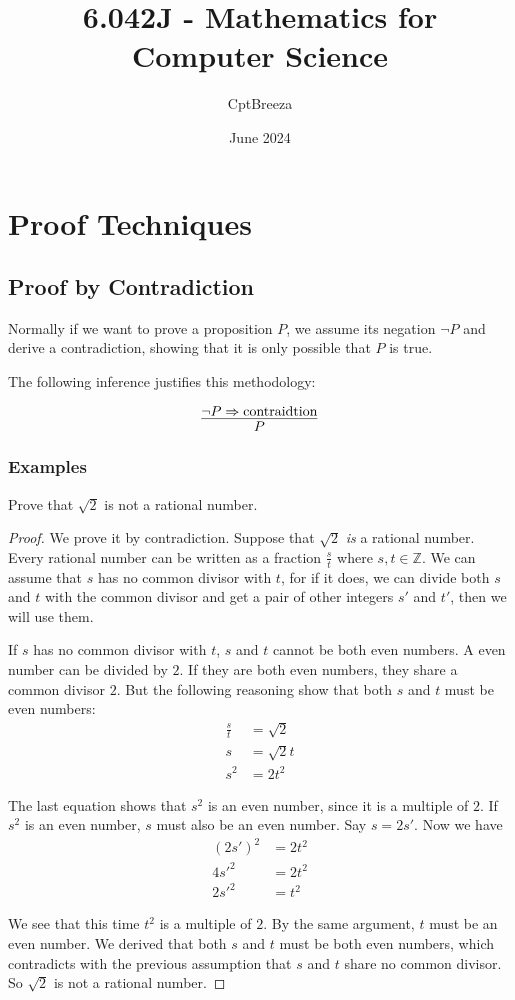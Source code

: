 \documentclass[11pt]{article}
\title{6.042J - Mathematics for Computer Science}
\author{CptBreeza}
\date{June 2024}
\begin{document}
\maketitle

\section{Proof Techniques}

\subsection{Proof by Contradiction}

Normally if we want to prove a proposition $P$, we assume its negation $\neg P$ and derive
a contradiction, showing that it is only possible that $P$ is true.

The following inference justifies this methodology:

\[
\infer{P}{\neg P \Rightarrow \text{contraidtion}}
\]

\subsubsection{Examples}

Prove that $\sqrt{2}$ is not a rational number.

\begin{proof}
We prove it by contradiction. Suppose that $\sqrt{2}$ \emph{is} a rational number. Every rational number can be written as a fraction $\frac{s}{t}$ where $s,t \in \mathbb{Z}$. We can assume that $s$ has no common divisor with $t$, for if it does, we can divide both $s$
and $t$ with the common divisor and get a pair of other integers $s'$ and $t'$, then we
will use them.

If $s$ has no common divisor with $t$, $s$ and $t$ cannot be both even numbers. A even
number can be divided by $2$. If they are both even numbers, they share a common divisor
$2$. But the following reasoning show that both $s$ and $t$ must be even numbers:
\begin{align*}
\frac{s}{t} &= \sqrt{2} \\
s &= \sqrt{2}t \\
s^2 &= 2t^2
\end{align*}

The last equation shows that $s^2$ is an even number, since it is a multiple of $2$. If
$s^2$ is an even number, $s$ must also be an even number. Say $s = 2s'$. Now we have
\begin{align*}
(2s')^2 &= 2t^2 \\
4s'^2 &= 2t^2 \\
2s'^2 &= t^2
\end{align*}

We see that this time $t^2$ is a multiple of $2$. By the same argument, $t$ must be an even
number. We derived that both $s$ and $t$ must be both even numbers, which contradicts with
the previous assumption that $s$ and $t$ share no common divisor. So $\sqrt{2}$ is not a
rational number.

\end{proof}
\end{document}

